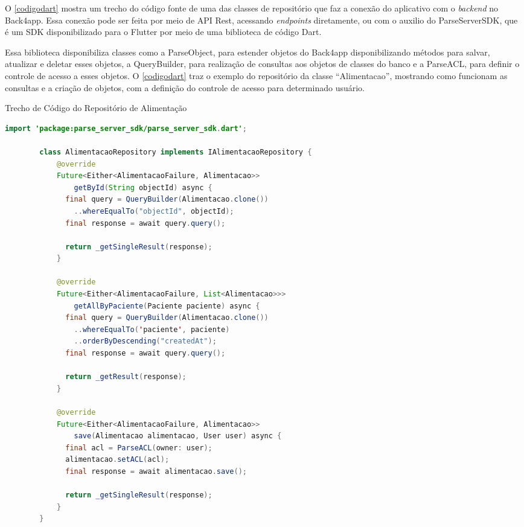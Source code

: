O \autoref{codigodart} mostra um trecho do código fonte de uma das classes de repositório
que faz a conexão do aplicativo com o \emph{backend} no Back4app. Essa conexão pode ser feita por meio de API Rest,
acessando \emph{endpoints} diretamente, ou com o auxilio do ParseServerSDK, que é um SDK disponibilizado para
o Flutter por meio de uma biblioteca de código Dart.

Essa biblioteca disponibiliza classes como a ParseObject, para estender objetos do Back4app disponibilizando
métodos para salvar, atualizar e deletar esses objetos, a QueryBuilder, para realização de consultas aos objetos
de classes do banco e a ParseACL, para definir o controle de acesso a esses objetos. O \autoref{codigodart}
traz o exemplo do repositório da classe ``Alimentacao'', mostrando como funcionam as consultas e a criação de objetos,
com a definição do controle de acesso para determinado usuário.

\begin{codigo}
    \caption{Trecho de Código do Repositório de Alimentação}
    \label{codigodart}
    \begin{lstlisting}[language = java]
        import 'package:parse_server_sdk/parse_server_sdk.dart';

        class AlimentacaoRepository implements IAlimentacaoRepository {
            @override
            Future<Either<AlimentacaoFailure, Alimentacao>>
                getById(String objectId) async {
              final query = QueryBuilder(Alimentacao.clone())
                ..whereEqualTo("objectId", objectId);
              final response = await query.query();
          
              return _getSingleResult(response);
            }
          
            @override
            Future<Either<AlimentacaoFailure, List<Alimentacao>>> 
                getAllByPaciente(Paciente paciente) async {
              final query = QueryBuilder(Alimentacao.clone())
                ..whereEqualTo('paciente', paciente)
                ..orderByDescending("createdAt");
              final response = await query.query();
          
              return _getResult(response);
            }
          
            @override
            Future<Either<AlimentacaoFailure, Alimentacao>>
                save(Alimentacao alimentacao, User user) async {
              final acl = ParseACL(owner: user);
              alimentacao.setACL(acl);
              final response = await alimentacao.save();
          
              return _getSingleResult(response);
            }
        }
  \end{lstlisting}
  \end{codigo}

